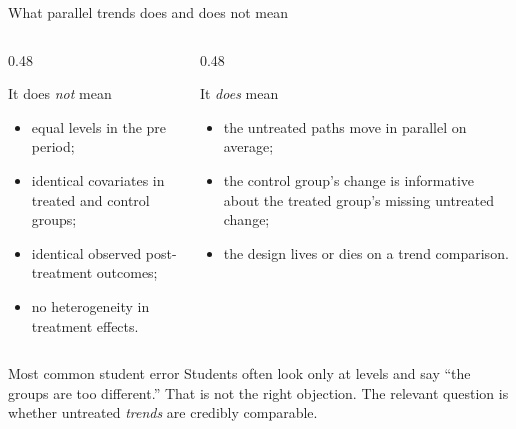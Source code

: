 \documentclass[10pt]{beamer}
\begin{document}
\begin{frame}{What parallel trends does and does not mean}
\label{slide:did_pt_interpret}
\small
\begin{columns}[T]
\begin{column}{0.48\textwidth}
\begin{block}{It does \emph{not} mean}
\begin{itemize}
  \item equal levels in the pre period;
  \item identical covariates in treated and control groups;
  \item identical observed post-treatment outcomes;
  \item no heterogeneity in treatment effects.
\end{itemize}
\end{block}
\end{column}
\begin{column}{0.48\textwidth}
\begin{block}{It \emph{does} mean}
\begin{itemize}
  \item the untreated paths move in parallel on average;
  \item the control group's change is informative about the treated group's missing untreated change;
  \item the design lives or dies on a trend comparison.
\end{itemize}
\end{block}
\end{column}
\end{columns}

\begin{alertblock}{Most common student error}
Students often look only at levels and say ``the groups are too different.'' That is not the right objection. The relevant question is whether untreated \emph{trends} are credibly comparable.
\end{alertblock}
\end{frame}
\end{document}
